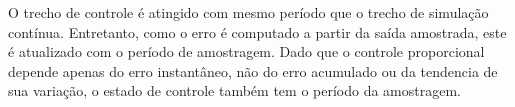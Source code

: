\documentclass[a4paper,12pt]{article}
\begin{document}
O trecho de controle é atingido com mesmo período que o trecho de simulação contínua. Entretanto, como o erro é computado a partir da saída amostrada, este é atualizado com o período de amostragem. Dado que o controle proporcional depende apenas do erro instantâneo, não do erro acumulado ou da tendencia de sua variação, o estado de controle também tem o período da amostragem.
\end{document}
